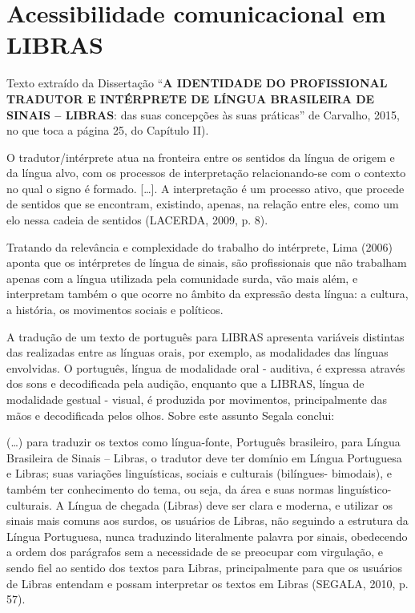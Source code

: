 \documentclass[
	12pt,				%
	openright,			%
  oneside,     %
	a4paper,			%
 hyphens,
	chapter=TITLE,		%
	english,			%
	french,				%
	spanish,			%
	brazil				%
	]{abntex2}
\begin{document}
\section{Acessibilidade comunicacional em LIBRAS}

Texto extraído da Dissertação “\textbf{A IDENTIDADE DO PROFISSIONAL TRADUTOR E INTÉRPRETE DE LÍNGUA BRASILEIRA DE SINAIS – LIBRAS}: das suas concepções às suas práticas” de Carvalho, 2015, no que toca a página 25, do Capítulo II).

\begin{citacao}
    O tradutor/intérprete atua na fronteira entre os sentidos da língua de origem e da língua alvo, com os processos de interpretação relacionando-se com o contexto no qual o signo é formado. [\ldots]. A interpretação é um processo ativo, que procede de sentidos que se encontram, existindo, apenas, na relação entre eles, como um elo nessa cadeia de sentidos (LACERDA, 2009, p. 8).
\end{citacao}

Tratando da relevância e complexidade do trabalho do intérprete, Lima (2006) aponta que os intérpretes de língua de sinais, são profissionais que não trabalham apenas com a língua utilizada pela comunidade surda, vão mais além, e interpretam também o que ocorre no âmbito da expressão desta língua: a cultura, a história, os movimentos sociais e políticos.

A tradução de um texto de português para LIBRAS apresenta variáveis distintas das realizadas entre as línguas orais, por exemplo, as modalidades das línguas envolvidas. O português, língua de modalidade oral - auditiva, é expressa através dos sons e decodificada pela audição, enquanto que a LIBRAS, língua de modalidade gestual - visual, é produzida por movimentos, principalmente das mãos e decodificada pelos olhos. Sobre este assunto Segala conclui:

\begin{citacao}
    (\ldots) para traduzir os textos como língua-fonte, Português brasileiro, para Língua Brasileira de Sinais – Libras, o tradutor deve ter domínio em Língua Portuguesa e Libras; suas variações linguísticas, sociais e culturais (bilíngues- bimodais), e também ter conhecimento do tema, ou seja, da área e suas normas linguístico- culturais. A Língua de chegada (Libras) deve ser clara e moderna, e utilizar os sinais mais comuns aos surdos, os usuários de Libras, não seguindo a estrutura da Língua Portuguesa, nunca traduzindo literalmente palavra por sinais, obedecendo a ordem dos parágrafos sem a necessidade de se preocupar com virgulação, e sendo fiel ao sentido dos textos para Libras, principalmente para que os usuários de Libras entendam e possam interpretar os textos em Libras (SEGALA, 2010, p. 57).
\end{citacao}
\end{document}
